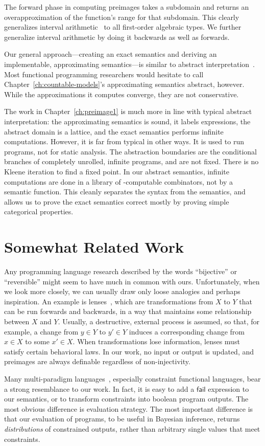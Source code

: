 The forward phase in computing preimages takes a subdomain and returns an overapproximation of the function's range for that subdomain.
This clearly generalizes interval arithmetic~\cite{cit:kearfott-1996eb-interval} to all first-order algebraic types.
We further generalize interval arithmetic by doing it backwards as well as forwards.

Our general approach---creating an exact semantics and deriving an implementable, approximating semantics---is similar to abstract interpretation~\cite{cit:cousot-1977popl-abstract-interpretation}.
Most functional programming researchers would hesitate to call Chapter~\ref{ch:countable-models}'s approximating semantics abstract, however.
While the approximations it computes converge, they are not conservative.

The work in Chapter~\ref{ch:preimage1} is much more in line with typical abstract interpretation: the approximating semantics is sound, it labels expressions, the abstract domain is a lattice, and the exact semantics performs infinite computations.
However, it is far from typical in other ways.
It is used to run programs, not for static analysis.
The abstraction boundaries are the conditional branches of completely unrolled, infinite programs, and are not fixed.
There is no Kleene iteration to find a fixed point.
In our abstract semantics, infinite computations are done in a library of \lzfclang-computable combinators, not by a semantic function.
This cleanly separates the syntax from the semantics, and allows us to prove the exact semantics correct mostly by proving simple categorical properties.


\section{Somewhat Related Work}

Any programming language research described by the words ``bijective'' or ``reversible'' might seem to have much in common with ours.
Unfortunately, when we look more closely, we can usually draw only loose analogies and perhaps inspiration.
An example is lenses~\cite{cit:hofmann-2012popl-edit-lenses}, which are transformations from $X$ to $Y$ that can be run forwards and backwards, in a way that maintains some relationship between $X$ and $Y$.
Usually, a destructive, external process is assumed, so that, for example, a change from $y \in Y$ to $y' \in Y$ induces a corresponding change from $x \in X$ to some $x' \in X$.
When transformations lose information, lenses must satisfy certain behavioral laws.
In our work, no input or output is updated, and preimages are always definable regardless of non-injectivity.

Many multi-paradigm languages~\cite{cit:hanus-2007lp-multi-paradigm}, especially constraint functional languages, bear a strong resemblance to our work.
In fact, it is easy to add a $\mathsf{fail}$ expression to our semantics, or to transform constraints into boolean program outputs.
The most obvious difference is evaluation strategy.
The most important difference is that our evaluation of programs, to be useful in Bayesian inference, returns \emph{distributions} of constrained outputs, rather than arbitrary single values that meet constraints.
